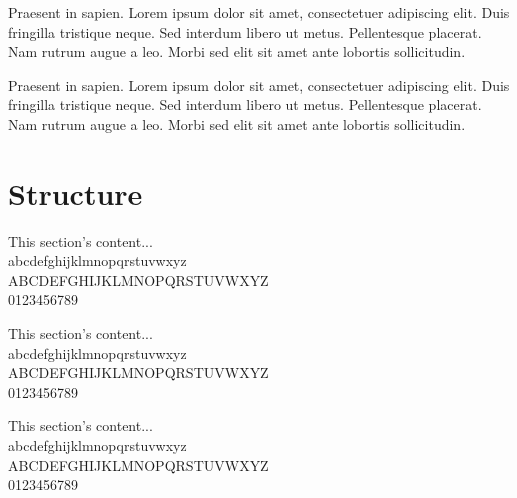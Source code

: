 \documentclass[a5paper,12pt,draft]{book} %
\begin{document}
Praesent in sapien. Lorem ipsum dolor sit amet, consectetuer adipiscing elit.
Duis fringilla tristique neque. Sed interdum libero ut metus. Pellentesque placerat.
Nam rutrum augue a leo. Morbi sed elit sit amet ante lobortis sollicitudin.

Praesent in sapien. Lorem ipsum dolor sit amet, consectetuer adipiscing elit.
Duis fringilla tristique neque. Sed interdum libero ut metus. Pellentesque placerat.
Nam rutrum augue a leo. Morbi sed elit sit amet ante lobortis sollicitudin.

\section*{Structure}
\small{This section's content... \\
abcdefghijklmnopqrstuvwxyz \\
ABCDEFGHIJKLMNOPQRSTUVWXYZ \\
0123456789}

\tiny{This section's content... \\
abcdefghijklmnopqrstuvwxyz \\
ABCDEFGHIJKLMNOPQRSTUVWXYZ \\
0123456789}

\normalsize{This section's content... \\
abcdefghijklmnopqrstuvwxyz \\
ABCDEFGHIJKLMNOPQRSTUVWXYZ \\
0123456789}

\clearpage

\vspace*{0.1\textheight}
\clearpage

\listoffigures

\listoftables

\tableofcontents
\clearpage
\end{document}
